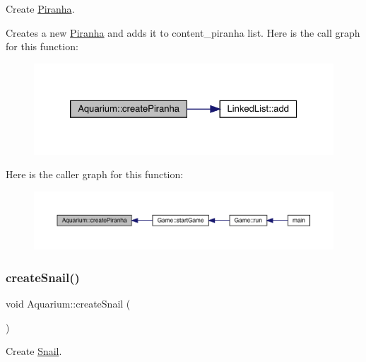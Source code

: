 Create \mbox{\hyperlink{class_piranha}{Piranha}}. 

Creates a new \mbox{\hyperlink{class_piranha}{Piranha}} and adds it to content\+\_\+piranha list. Here is the call graph for this function\+:\nopagebreak
\begin{figure}[H]
\begin{center}
\leavevmode
\includegraphics[width=326pt]{class_aquarium_a416b16bc7c252260b9cbe053a6e5a76c_cgraph}
\end{center}
\end{figure}
Here is the caller graph for this function\+:\nopagebreak
\begin{figure}[H]
\begin{center}
\leavevmode
\includegraphics[width=350pt]{class_aquarium_a416b16bc7c252260b9cbe053a6e5a76c_icgraph}
\end{center}
\end{figure}
\mbox{\label{class_aquarium_ae631c3fd8587b1889ffea4e0ade6359e}} 
\subsubsection{\texorpdfstring{create\+Snail()}{createSnail()}}
{\footnotesize\ttfamily void Aquarium\+::create\+Snail (\begin{DoxyParamCaption}{ }\end{DoxyParamCaption})}



Create \mbox{\hyperlink{class_snail}{Snail}}. 

